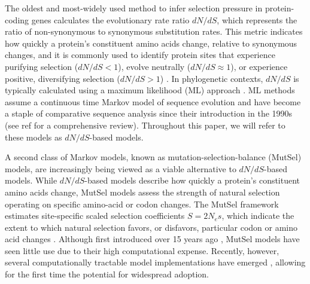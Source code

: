 \documentclass[11pt]{article}
\begin{document}
The oldest and most-widely used method to infer selection pressure in protein-coding genes calculates the evolutionary rate ratio $dN/dS$, which represents the ratio of non-synonymous to synonymous substitution rates. This metric indicates how quickly a protein's constituent amino acids change, relative to synonymous changes, and it is commonly used to identify protein sites that experience purifying selection ($dN/dS<1$), evolve neutrally ($dN/dS\approx1$), or experience positive, diversifying selection ($dN/dS>1$) \cite{NielsenYang1998, Yangetal2000, KosakovskyPondFrost2005b, Huelsenbecketal2006}. In phylogenetic contexts, $dN/dS$ is typically calculated using a maximum likelihood (ML) approach \cite{GoldmanYang1994,MuseGaut1994,NielsenYang1998,Yang2006}. ML methods assume a continuous time Markov model of sequence evolution and have become a staple of comparative sequence analysis since their introduction in the 1990s (see ref \cite{Anisimova2009} for a comprehensive review). Throughout this paper, we will refer to these models as $dN/dS$-based models.

A second class of Markov models, known as mutation-selection-balance (MutSel) models, are increasingly being viewed as a viable alternative to $dN/dS$-based models. While $dN/dS$-based models describe how quickly a protein's constituent amino acids change, MutSel models assess the strength of natural selection operating on specific amino-acid or codon changes. The MutSel framework estimates site-specific scaled selection coefficients $S=2N_es$, which indicate the extent to which natural selection favors, or disfavors, particular codon or amino acid changes \cite{HalpernBruno1998,YangNielsen2008,Rodrigueetal2010,Tamurietal2012}. Although first introduced over 15 years ago \cite{HalpernBruno1998}, MutSel models have seen little use due to their high computational expense. Recently, however, several computationally tractable model implementations have emerged \cite{RodrigueLartillot2014,Tamurietal2014}, allowing for the first time the potential for widespread adoption.		
		
\end{document}
